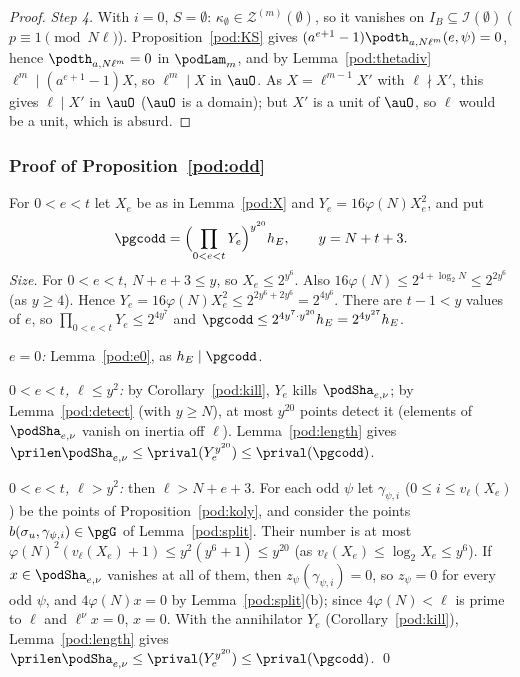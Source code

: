 \documentclass[10pt]{amsart}
\theoremstyle{definition}
\theoremstyle{remark}
\begin{document}
\begin{proof}
\emph{Step 4.} With $i=0$, $S=\emptyset$: $\kappa_\emptyset\in\mathcal Z^{(m)}(\emptyset)$, so it
vanishes on $I_B\subseteq\mathcal I(\emptyset)$ ($p\equiv1\pmod{N\ell}$). Proposition~\ref{pod:KS}
gives $(a^{e+1}-1)\podth_{a,N\ell^m}(e,\psi)=0$, hence $\podth_{a,N\ell^m}=0$ in $\podLam_m$, and by
Lemma~\ref{pod:thetadiv} $\ell^m\mid(a^{e+1}-1)X$, so $\ell^m\mid X$ in $\auO$. As
$X=\ell^{m-1}X'$ with $\ell\nmid X'$, this gives $\ell\mid X'$ in $\auO$ ($\auO$ is a domain); but $X'$ is
a unit of $\auO$, so $\ell$ would be a unit, which is absurd.
\end{proof}

\subsubsection{Proof of Proposition~\ref{pod:odd}}\label{pod:ss-proof}

For $0<e<t$ let $X_e$ be as in Lemma~\ref{pod:X} and $Y_e=16\varphi(N)X_e^2$, and put
\[
\pgcodd=\Bigl(\prod_{0<e<t}Y_e\Bigr)^{y^{20}}h_E,\qquad y=N+t+3 .
\]
\emph{Size.} For $0<e<t$, $N+e+3\le y$, so $X_e\le2^{y^6}$. Also $16\varphi(N)\le2^{4+\log_2N}
\le2^{2y^6}$ (as $y\ge4$). Hence $Y_e=16\varphi(N)X_e^2\le2^{2y^6+2y^6}=2^{4y^6}$. There are $t-1<y$
values of $e$, so $\prod_{0<e<t}Y_e\le2^{4y^7}$ and $\pgcodd\le2^{4y^7\cdot y^{20}}h_E=2^{4y^{27}}h_E$.

\emph{$e=0$:} Lemma~\ref{pod:e0}, as $h_E\mid\pgcodd$.

\emph{$0<e<t$, $\ell\le y^2$:} by Corollary~\ref{pod:kill}, $Y_e$ kills $\podSha_{e,\nu}$; by
Lemma~\ref{pod:detect} (with $y\ge N$), at most $y^{20}$ points detect it (elements of
$\podSha_{e,\nu}$ vanish on inertia off $\ell$). Lemma~\ref{pod:length} gives
$\prilen\podSha_{e,\nu}\le\prival(Y_e^{y^{20}})\le\prival(\pgcodd)$.

\emph{$0<e<t$, $\ell>y^2$:} then $\ell>N+e+3$. For each odd $\psi$ let $\gamma_{\psi,i}$ ($0\le i\le
v_\ell(X_e)$) be the points of Proposition~\ref{pod:koly}, and consider the points $b(\sigma_u,
\gamma_{\psi,i})\in\pgG$ of Lemma~\ref{pod:split}. Their number is at most $\varphi(N)^2(v_\ell(X_e)+1)
\le y^2(y^6+1)\le y^{20}$ (as $v_\ell(X_e)\le\log_2X_e\le y^6$). If $x\in\podSha_{e,\nu}$ vanishes at all
of them, then $z_\psi(\gamma_{\psi,i})=0$, so $z_\psi=0$ for every odd $\psi$, and $4\varphi(N)x=0$ by
Lemma~\ref{pod:split}(b); since $4\varphi(N)<\ell$ is prime to $\ell$ and $\ell^\nu x=0$, $x=0$. With
the annihilator $Y_e$ (Corollary~\ref{pod:kill}), Lemma~\ref{pod:length} gives $\prilen
\podSha_{e,\nu}\le\prival(Y_e^{y^{20}})\le\prival(\pgcodd)$. \qed
\end{document}
